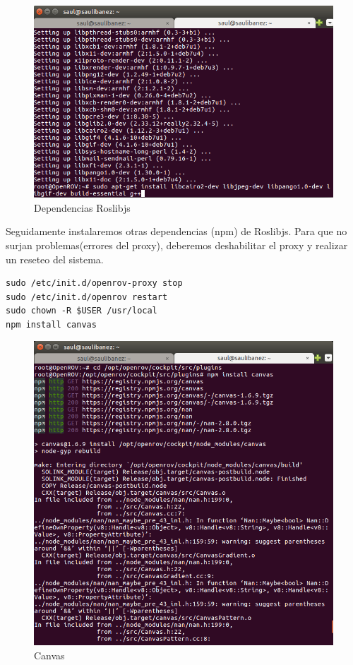 \begin{figure} [hbtp]
  \begin{center}
    \includegraphics[width=12cm]{img/cap4/dependencias_roslibjs}
  \end{center}
  \caption{Dependencias Roslibjs}
  \label{fig:Dependencias Roslibjs}
\end{figure}

Seguidamente instalaremos otras dependencias (npm) de Roslibjs.
Para que no surjan problemas(errores del proxy), deberemos deshabilitar el proxy y realizar un reseteo del sistema. 
\renewcommand{\lstlistingname}{}
\begin{lstlisting}[caption=Dependencias Roslibjs, label={lst:roslibjs}]
sudo /etc/init.d/openrov-proxy stop
sudo /etc/init.d/openrov restart
sudo chown -R $USER /usr/local 
npm install canvas 
\end{lstlisting}

\newpage
\begin{figure} [hbtp]
  \begin{center}
    \includegraphics[width=12cm]{img/cap4/canvas}
  \end{center}
  \caption{Canvas}
  \label{fig:canvas}
\end{figure}

